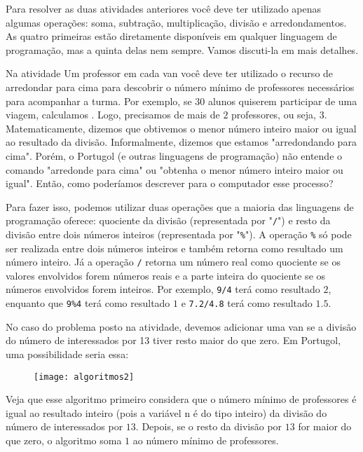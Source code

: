 Para resolver as duas atividades anteriores você deve ter utilizado apenas algumas operações: soma, subtração, multiplicação, divisão e arredondamentos. As quatro primeiras estão diretamente disponíveis em qualquer linguagem de programação, mas a quinta delas nem sempre. Vamos discuti-la em mais detalhes.

Na atividade Um professor em cada van você deve ter utilizado o recurso de arredondar para cima para descobrir o número mínimo de professores necessários para acompanhar a turma. Por exemplo, se $30$ alunos quiserem participar de uma viagem, calculamos . Logo, precisamos de mais de $2$ professores, ou seja, $3$. Matematicamente, dizemos que obtivemos o menor número inteiro maior ou igual ao resultado da divisão. Informalmente, dizemos que estamos "arredondando para cima". Porém, o Portugol (e outras linguagens de programação) não entende o comando "arredonde para cima"{} ou "obtenha o menor número inteiro maior ou igual". Então, como poderíamos descrever para o computador esse processo?

Para fazer isso, podemos utilizar duas operações que a maioria das linguagens de programação oferece: quociente da divisão (representada por "\verb|/|") e resto da divisão entre dois números inteiros (representada por "\verb|%|"). A operação \verb|%| só pode ser realizada entre dois números inteiros e também retorna como resultado um número inteiro. Já a operação \verb|/| retorna um número real como quociente se os valores envolvidos forem números reais e a parte inteira do quociente se os números envolvidos forem inteiros. Por exemplo, \verb|9/4| terá como resultado $2$, enquanto que \verb|9%4| terá como resultado $1$ e \verb|7.2/4.8| terá como resultado $1.5$.

No caso do problema posto na atividade, devemos adicionar uma van se a divisão do número de interessados por 13 tiver resto maior do que zero. Em Portugol, uma possibilidade seria essa:

\begin{figure}[H]
\centering

\texttt{[image: algoritmos2]}
\end{figure}

Veja que esse algoritmo primeiro considera que o número mínimo de professores é igual ao resultado inteiro (pois a variável n é do tipo inteiro) da divisão do número de interessados por $13$. Depois, se o resto da divisão por $13$ for maior do que zero, o algoritmo soma $1$ ao número mínimo de professores.

